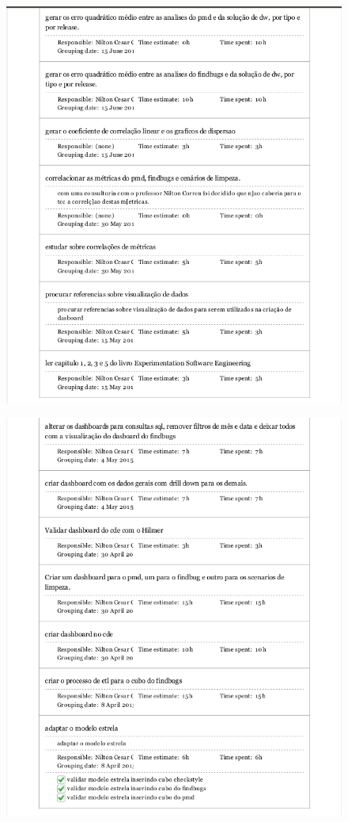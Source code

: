 \begin{apendicesenv}
\begin{figure}[h!]
\centering
\includegraphics[keepaspectratio=false,scale=0.70]{figuras/figuras_nilton/kanban3.png}
\end{figure}

\begin{figure}[h!]
\centering
\includegraphics[keepaspectratio=false,scale=0.70]{figuras/figuras_nilton/kanban4.png}
\end{figure}


\end{apendicesenv}
